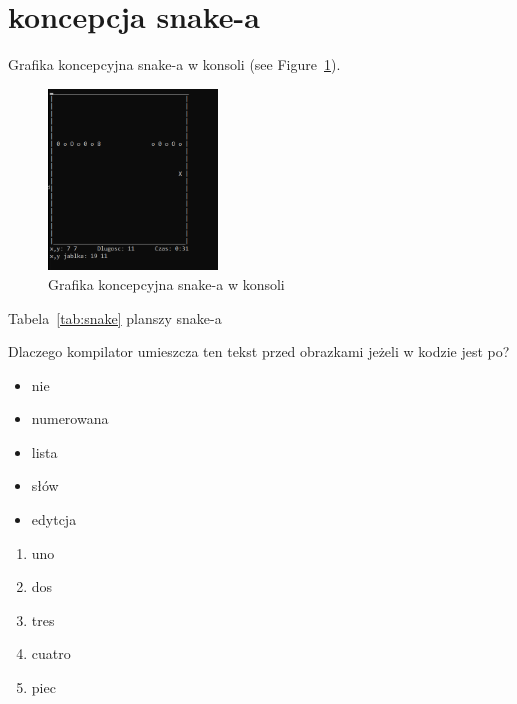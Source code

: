 \pagebreak
\section{koncepcja snake-a} %
\label{sec:Grzyb}

Grafika koncepcyjna snake-a w konsoli (see Figure~\ref{fig:snake}).

\begin{figure}[hthp] %
    \centering
    \includegraphics[width=0.4\textwidth]{pictures/snake.png} %
    \caption{Grafika koncepcyjna snake-a w konsoli}
    \label{fig:snake}
\end{figure}

Tabela~\ref{tab:snake} planszy snake-a %



Dlaczego kompilator umieszcza ten tekst przed obrazkami jeżeli w kodzie jest po?

\begin{itemize}
  \item nie
  \item numerowana
  \item lista 
  \item słów
  \item edytcja

\end{itemize}
\pagebreak

\begin{enumerate}
    \item uno
    \item dos
    \item tres
    \item cuatro
    \item piec
\end{enumerate}

\vspace{4pt}

